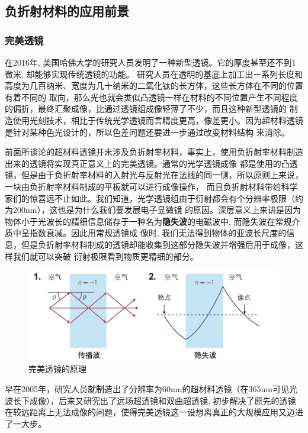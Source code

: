 \documentclass[UTF8]{ctexart}
\begin{document}
\subsection{负折射材料的应用前景}
\subsubsection{完美透镜\cite{RN25}}
在2016年, 美国哈佛大学的研究人员发明了一种新型透镜。它的厚度甚至还不到1微米, 却能够实现传统透镜的功能。
研究人员在透明的基底上加工出一系列长度和高度为几百纳米、宽度为几十纳米的二氧化钛的长方体，这些长方体在不同的位置有着不同的
取向，那么光也就会类似凸透镜一样在材料的不同位置产生不同程度的偏折，最终汇聚成像，比通过透镜组成像轻薄了不少，而且这种新型透镜的
制造使用光刻技术，相比于传统光学透镜而言精度更高，像差更小。因为超材料透镜是针对某种色光设计的，所以色差问题还要进一步通过改变材料结构
来消除。


前面所谈论的超材料透镜并未涉及负折射率材料，事实上，使用负折射率材料制造出来的透镜将实现真正意义上的完美透镜。通常的光学透镜成像
都是使用的凸透镜，但是由于负折射率材料的入射光与反射光在法线的同一侧，所以原则上来说，一块由负折射率材料制成的平板就可以进行成像操作，
而且负折射材料带给科学家们的惊喜远不止如此。我们知道，光学透镜组由于衍射都会有个分辨率极限（约为200nm），这也是为什么我们要发展电子显微镜
的原因。深层意义上来讲是因为物体小于光波长的精细信息储存于一种名为\textbf{隐失波}的电磁波中, 而隐失波在常规介质中呈指数衰减。因此用常规透镜成
像时, 我们无法得到物体的亚波长尺度的信息，但是负折射率材料制成的透镜却能收集到这部分隐失波并增强后用于成像，这样我们就可以突破
衍射极限看到物质更精细的部分。

\begin{figure}[htbp]
\centering
\includegraphics{perfect_lens.jpg}
\caption{完美透镜的原理}   
\end{figure}


早在2005年，研究人员就制造出了分辨率为60nm的超材料透镜（在365nm可见光波长下成像），后来又研究出了远场超透镜和双曲超透镜, 
初步解决了原先的透镜在较远距离上无法成像的问题，使得完美透镜这一设想离真正的大规模应用又迈进了一大步。
\end{document}
